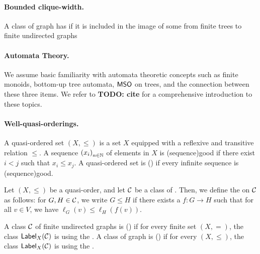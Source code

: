 \paragraph*{Bounded clique-width.} A class of graph has  if it is included in the image of some 
from finite trees to finite undirected graphs \cite{COUR91}

\paragraph*{Automata Theory.} We assume basic familiarity with
automata theoretic concepts such as finite monoids, bottom-up tree automata,
$\mathsf{MSO}$ on trees, and the connection between these three items. We refer to
\textbf{TODO: cite} for a comprehensive introduction to these topics.


\paragraph*{Well-quasi-orderings.} A quasi-ordered set $(X, \leq)$ is a set $X$
equipped with a reflexive and transitive relation $\leq$. A sequence
$\seqof{x_i}$ of elements in $X$ is \intro(sequence){good} if there exist $i <
j$ such that $x_i \leq x_j$. A quasi-ordered set is 
() if every infinite sequence is \kl(sequence){good}.

\AP Let $(X, \leq)$ be a quasi-order, and let $\mathcal{C}$ be a class of
. Then, we define the 
on $\mathcal{C}$ as follows: for $G, H \in \mathcal{C}$, we write $G \leq H$ if there exists
a  $f \colon G \to H$ such that for all $v \in V$, we have
$\ell_G(v) \leq \ell_H(f(v))$. 

\AP A class $\mathcal{C}$ of finite undirected graphs is
 () if for every
finite set $(X,=)$, the class $\mathsf{Label}_{X}(\mathcal{C})$ is 
using the . A class of graph is
 () if for every
 $(X, \leq)$, the class $\mathsf{Label}_{X}(\mathcal{C})$ is
 using the .







